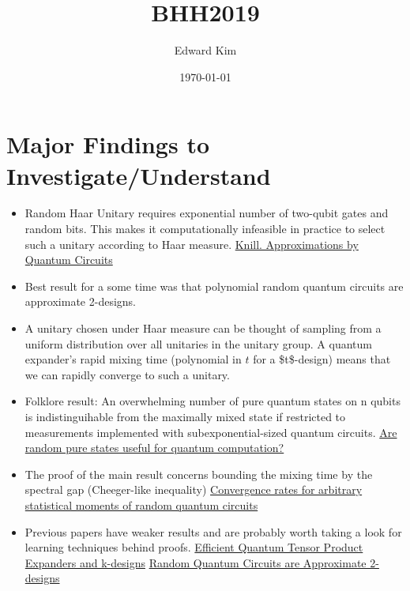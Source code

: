 \documentclass[a4paper]{article}
\author{Edward Kim}
\date{\today}
\title{BHH2019}
\begin{document}
\maketitle
\tableofcontents


\section{Major Findings to Investigate/Understand}
\label{sec:orge1080b4}
\begin{itemize}
\item Random Haar Unitary requires exponential number of two-qubit gates and random bits.
This makes it computationally infeasible in practice to select such a unitary according to Haar measure.
\href{https://arxiv.org/pdf/quant-ph/9508006.pdf}{Knill. Approximations by Quantum Circuits}

\item Best result for a some time was that polynomial random quantum circuits are approximate 2-designs.
\item A unitary chosen under Haar measure can be thought of sampling from a uniform distribution over all unitaries in the unitary group.
A quantum expander's rapid mixing time (polynomial in \(t\) for a \$t\$-design) means that we can rapidly converge to such a unitary.

\item Folklore result: An overwhelming number of pure quantum states on n qubits is indistinguihable from the maximally mixed state if restricted to measurements implemented with subexponential-sized quantum circuits.
\href{https://arxiv.org/pdf/0812.3001.pdf}{Are random pure states useful for quantum computation?}

\item The proof of the main result concerns bounding the mixing time by the spectral gap (Cheeger-like inequality)
\href{https://arxiv.org/pdf/0910.0913.pdf}{Convergence rates for arbitrary statistical moments of random quantum circuits}
\item Previous papers have weaker results and are probably worth taking a look for learning techniques behind proofs.
\href{https://arxiv.org/pdf/0811.2597.pdf}{Efficient Quantum Tensor Product Expanders and k-designs}
\href{https://link.springer.com/content/pdf/10.1007/s00220-009-0873-6.pdf}{Random Quantum Circuits are Approximate 2-designs}
\end{itemize}
\end{document}
